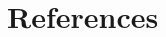 \documentclass[main.tex]{subfiles}
\begin{document}
\section{References}


\begin{thebibliography}{91}


\end{thebibliography}







\clearpage 
\end{document}
